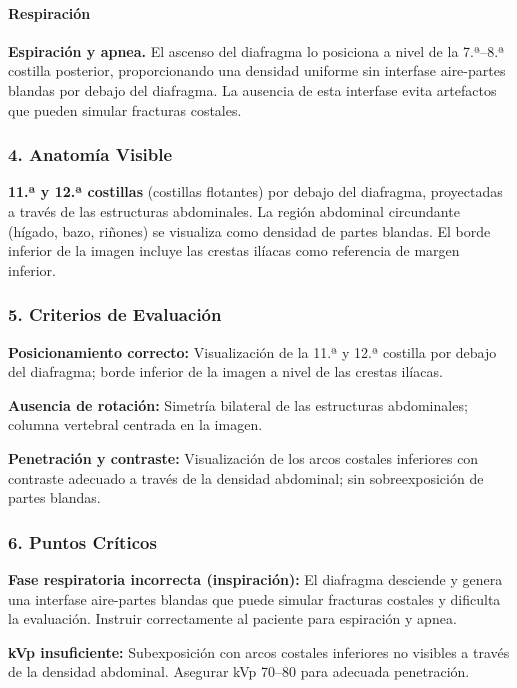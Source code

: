 	\paragraph{Respiración}
	\textbf{Espiración y apnea.} El ascenso del diafragma lo posiciona a nivel de la 7.ª--8.ª costilla posterior, proporcionando una densidad uniforme sin interfase aire-partes blandas por debajo del diafragma. La ausencia de esta interfase evita artefactos que pueden simular fracturas costales.
	
	\subsubsection*{4. Anatomía Visible}
	
	\textbf{11.ª y 12.ª costillas} (costillas flotantes) por debajo del diafragma, proyectadas a través de las estructuras abdominales. La región abdominal circundante (hígado, bazo, riñones) se visualiza como densidad de partes blandas. El borde inferior de la imagen incluye las crestas ilíacas como referencia de margen inferior.
	
	\subsubsection*{5. Criterios de Evaluación}
	
	\textbf{Posicionamiento correcto:} Visualización de la 11.ª y 12.ª costilla por debajo del diafragma; borde inferior de la imagen a nivel de las crestas ilíacas.
	
	\textbf{Ausencia de rotación:} Simetría bilateral de las estructuras abdominales; columna vertebral centrada en la imagen.
	
	\textbf{Penetración y contraste:} Visualización de los arcos costales inferiores con contraste adecuado a través de la densidad abdominal; sin sobreexposición de partes blandas.
	
	\subsubsection*{6. Puntos Críticos}
	
	\textbf{Fase respiratoria incorrecta (inspiración):} El diafragma desciende y genera una interfase aire-partes blandas que puede simular fracturas costales y dificulta la evaluación. Instruir correctamente al paciente para espiración y apnea.
	
	\textbf{kVp insuficiente:} Subexposición con arcos costales inferiores no visibles a través de la densidad abdominal. Asegurar kVp 70--80 para adecuada penetración.
	
